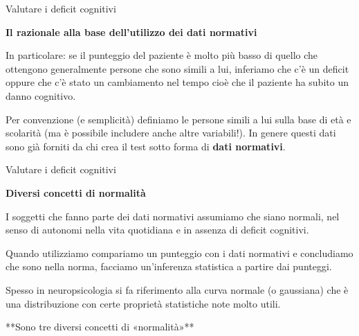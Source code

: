 \documentclass[
  ignorenonframetext,
]{beamer}
\begin{document}
\begin{frame}{Valutare i deficit cognitivi}
\label{valutare-i-deficit-cognitivi-13}
\begin{center}
  \textbf{Il razionale alla base dell’utilizzo dei dati normativi}
\end{center}

In particolare: se il punteggio del paziente è molto più basso di quello
che ottengono generalmente persone che sono simili a lui, inferiamo che
c'è un deficit oppure che c'è stato un cambiamento nel tempo cioè che il
paziente ha subito un danno cognitivo.

Per convenzione (e semplicità) definiamo le persone simili a lui sulla
base di età e scolarità (ma è possibile includere anche altre
variabili!). In genere questi dati sono già forniti da chi crea il test
sotto forma di \textbf{dati normativi}.
\end{frame}

\begin{frame}{Valutare i deficit cognitivi}
\label{valutare-i-deficit-cognitivi-14}
\begin{center}
  \textbf{Diversi concetti di normalità}
\end{center}

I soggetti che fanno parte dei dati normativi assumiamo che siano
normali, nel senso di autonomi nella vita quotidiana e in assenza di
deficit cognitivi.

Quando utilizziamo compariamo un punteggio con i dati normativi e
concludiamo che sono nella norma, facciamo un'inferenza statistica a
partire dai punteggi.

Spesso in neuropsicologia si fa riferimento alla curva normale (o
gaussiana) che è una distribuzione con certe proprietà statistiche note
molto utili.

\begin{center}
  **Sono tre diversi concetti di «normalità»**
\end{center}
\end{frame}
\end{document}
